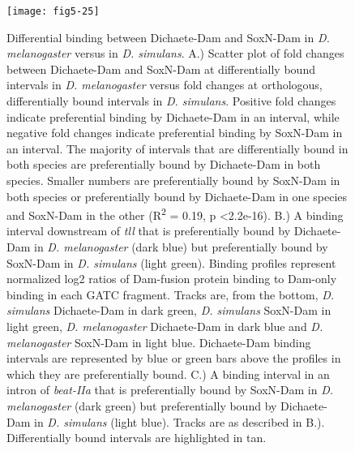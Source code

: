 \begin{figure}[H]
\centering
\texttt{[image: fig5-25]}
\caption{Differential binding between Dichaete-Dam and SoxN-Dam in \emph{D. melanogaster} versus in \emph{D. simulans}. A.) Scatter plot of fold changes between Dichaete-Dam and SoxN-Dam at differentially bound intervals in \emph{D. melanogaster} versus fold changes at orthologous, differentially bound intervals in \emph{D. simulans}. Positive fold changes indicate preferential binding by Dichaete-Dam in an interval, while negative fold changes indicate preferential binding by SoxN-Dam in an interval. The majority of intervals that are differentially bound in both species are preferentially bound by Dichaete-Dam in both species. Smaller numbers are preferentially bound by SoxN-Dam in both species or preferentially bound by Dichaete-Dam in one species and SoxN-Dam in the other (R\textsuperscript{2} = 0.19, p \textless 2.2e-16). B.) A binding interval downstream of \emph{tll} that is preferentially bound by Dichaete-Dam in \emph{D. melanogaster} (dark blue) but preferentially bound by SoxN-Dam in \emph{D. simulans} (light green). Binding profiles represent normalized log2 ratios of Dam-fusion protein binding to Dam-only binding in each GATC fragment. Tracks are, from the bottom, \emph{D. simulans} Dichaete-Dam in dark green, \emph{D. simulans} SoxN-Dam in light green, \emph{D. melanogaster} Dichaete-Dam in dark blue and \emph{D. melanogaster} SoxN-Dam in light blue. Dichaete-Dam binding intervals are represented by blue or green bars above the profiles in which they are preferentially bound. C.) A binding interval in an intron of \emph{beat-IIa} that is preferentially bound by SoxN-Dam in \emph{D. melanogaster} (dark green) but preferentially bound by Dichaete-Dam in \emph{D. simulans} (light blue). Tracks are as described in B.). Differentially bound intervals are highlighted in tan.}
\label{Figure 5.25}
\end{figure}

